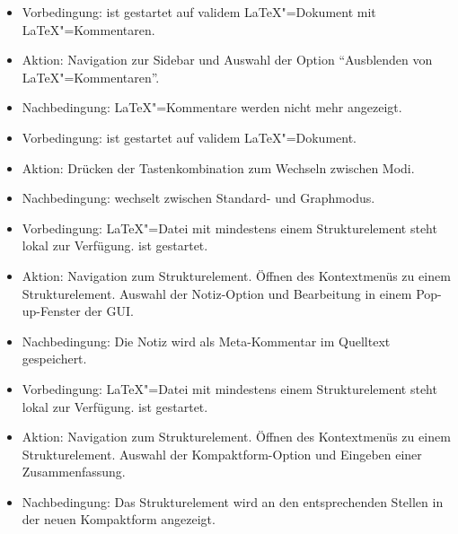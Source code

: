 \begin{itemize}
  \item Vorbedingung: \texla{} ist gestartet auf validem \LaTeX"=Dokument mit \LaTeX"=Kommentaren.
  \item Aktion: Navigation zur Sidebar und Auswahl der Option \enquote{Ausblenden von \LaTeX"=Kommentaren}.
  \item Nachbedingung: \LaTeX"=Kommentare werden nicht mehr angezeigt.
\end{itemize}

\begin{itemize}
  \item Vorbedingung: \texla{} ist gestartet auf validem \LaTeX"=Dokument.
  \item Aktion: Drücken der Tastenkombination zum Wechseln zwischen Modi.
  \item Nachbedingung: \texla{} wechselt zwischen Standard- und Graphmodus.
\end{itemize}

\begin{itemize}
  \item Vorbedingung: \LaTeX"=Datei mit mindestens einem Strukturelement steht lokal zur Verfügung.
  \texla{} ist gestartet.
  \item Aktion: Navigation zum Strukturelement.
  Öffnen des Kontextmenüs zu einem Strukturelement.
  Auswahl der Notiz-Option und Bearbeitung in einem Pop-up-Fenster der GUI.
  \item Nachbedingung: Die Notiz wird als Meta-Kommentar im Quelltext gespeichert.
\end{itemize}

\begin{itemize}
  \item Vorbedingung: \LaTeX"=Datei mit mindestens einem Strukturelement steht lokal zur Verfügung.
  \texla{} ist gestartet.
  \item Aktion: Navigation zum Strukturelement.
  Öffnen des Kontextmenüs zu einem Strukturelement.
  Auswahl der Kompaktform-Option und Eingeben einer Zusammenfassung.
  \item Nachbedingung: Das Strukturelement wird an den entsprechenden Stellen in der neuen Kompaktform angezeigt.
\end{itemize}

